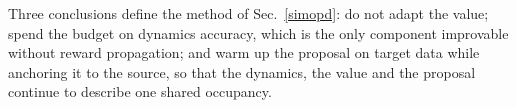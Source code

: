 Three conclusions define the method of Sec.~\ref{simopd}: do not adapt the
value; spend the budget on dynamics accuracy, which is the only component
improvable without reward propagation; and warm up the proposal on target data
while anchoring it to the source, so that the dynamics, the value and the
proposal continue to describe one shared occupancy.


